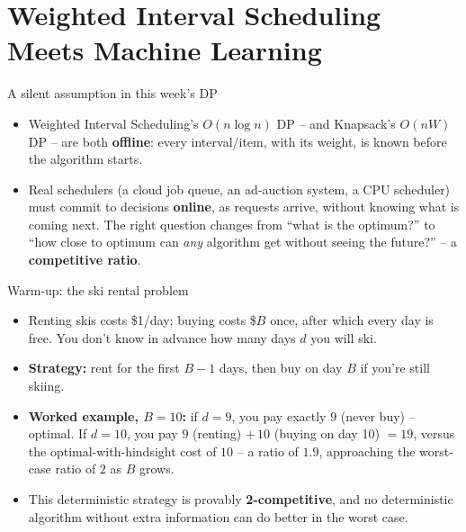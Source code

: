 \documentclass[11pt,aspectratio=169]{beamer}
\begin{document}
\section{Weighted Interval Scheduling Meets Machine Learning}

\begin{frame}{A silent assumption in this week's DP}
  \begin{itemize}
    \item Weighted Interval Scheduling's $O(n\log n)$ DP -- and Knapsack's $O(nW)$ DP --
    are both \textbf{offline}: every interval/item, with its weight, is known before the
    algorithm starts.
    \item Real schedulers (a cloud job queue, an ad-auction system, a CPU scheduler)
    must commit to decisions \textbf{online}, as requests arrive, without knowing what
    is coming next. The right question changes from ``what is the optimum?'' to ``how
    close to optimum can \emph{any} algorithm get without seeing the future?'' -- a
    \textbf{competitive ratio}.
  \end{itemize}
\end{frame}

\begin{frame}{Warm-up: the ski rental problem}
  \small
  \begin{itemize}
    \item Renting skis costs \$1/day; buying costs \$$B$ once, after which every day is
    free. You don't know in advance how many days $d$ you will ski.
    \item \textbf{Strategy:} rent for the first $B-1$ days, then buy on day $B$ if you're
    still skiing.
    \item \textbf{Worked example, $B=10$:} if $d=9$, you pay exactly $9$ (never buy) --
    optimal. If $d=10$, you pay $9$ (renting) $+\,10$ (buying on day 10) $= 19$, versus
    the optimal-with-hindsight cost of $10$ -- a ratio of $1.9$, approaching the
    worst-case ratio of $2$ as $B$ grows.
    \item This deterministic strategy is provably \textbf{2-competitive}, and no
    deterministic algorithm without extra information can do better in the worst case.
  \end{itemize}
\end{frame}
\end{document}
